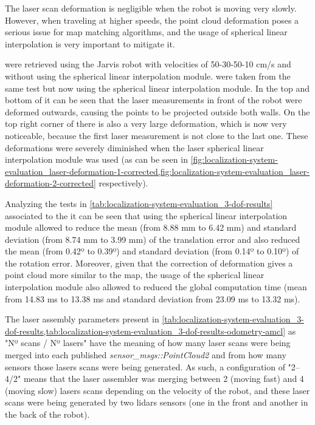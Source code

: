 The laser scan deformation is negligible when the robot is moving very slowly. However, when traveling at higher speeds, the point cloud deformation poses a serious issue for map matching algorithms, and the usage of spherical linear interpolation is very important to mitigate it.

 were retrieved using the Jarvis robot with velocities of 50-30-50-10 cm/s and without using the spherical linear interpolation module.  were taken from the same test but now using the spherical linear interpolation module. In the top and bottom of  it can be seen that the laser measurements in front of the robot were deformed outwards, causing the points to be projected outside both walls. On the top right corner of  there is also a very large deformation, which is now very noticeable, because the first laser measurement is not close to the last one. These deformations were severely diminished when the laser spherical linear interpolation module was used (as can be seen in \cref{fig:localization-system-evaluation_laser-deformation-1-corrected,fig:localization-system-evaluation_laser-deformation-2-corrected} respectively).

Analyzing the tests in \cref{tab:localization-system-evaluation_3-dof-results} associated to the  it can be seen that using the spherical linear interpolation module allowed to reduce the mean (from 8.88 mm to 6.42 mm) and standard deviation (from 8.74 mm to 3.99 mm) of the translation error and also reduced the mean (from 0.42º to 0.39º) and standard deviation (from 0.14º to 0.10º) of the rotation error. Moreover, given that the correction of deformation gives a point cloud more similar to the map, the usage of the spherical linear interpolation module also allowed to reduced the global computation time (mean from 14.83 ms to 13.38 ms and standard deviation from 23.09 ms to 13.32 ms).

The laser assembly parameters present in \cref{tab:localization-system-evaluation_3-dof-results,tab:localization-system-evaluation_3-dof-results-odometry-amcl} as "Nº scans / Nº lasers" have the meaning of how many laser scans were being merged into each published \emph{sensor\_msgs::PointCloud2} and from how many sensors those lasers scans were being generated. As such, a configuration of "2--4/2" means that the laser assembler was merging between 2 (moving fast) and 4 (moving slow) lasers scans depending on the velocity of the robot, and these laser scans were being generated by two \glspl{lidar} sensors (one in the front and another in the back of the robot).


